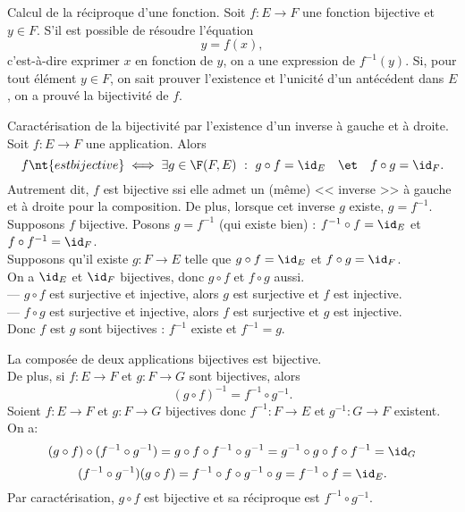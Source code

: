\documentclass[11pt]{article}
\begin{document}
\begin{meth}{Calcul de la réciproque d'une fonction.}{}
    Soit $f:E\to F$ une fonction bijective et $y\in F$. S'il est possible de résoudre l'équation
    \begin{equation*}
        y = f(x),
    \end{equation*}
    c'est-à-dire exprimer $x$ en fonction de $y$, on a une expression de $f^{-1}(y)$.\n
    Si, pour tout élément $y\in F$, on sait prouver l'existence et l'unicité d'un antécédent dans $E$, on a prouvé la bijectivité de $f$.
\end{meth}

\begin{thm}{Caractérisation de la bijectivité par l'existence d'un inverse à gauche et à droite.}{}
    Soit $f:E\to F$ une application. Alors
    \begin{equation*}
        f \nt{ est bijective} \iff \exists g \in \F(F,E) ~:~ g\circ f = \id_E \quad\et\quad f\circ g = \id_F.
    \end{equation*}
    Autrement dit, $f$ est bijective ssi elle admet un (même) << inverse >> à gauche et à droite pour la composition. De plus, lorsque cet inverse $g$ existe, $g=f^{-1}$.
    \tcblower
    \boxed{\ra} Supposons $f$ bijective. Posons $g=f^{-1}$ (qui existe bien) : $f^{-1}\circ f = \id_E$ et $f\circ f^{-1}=\id_F$.\\
    \boxed{\la} Supposons qu'il existe $g:F\to E$ telle que $g\circ f=\id_E$ et $f\circ g=\id_F$.\\
    On a $\id_E$ et $\id_F$ bijectives, donc $g\circ f$ et $f\circ g$ aussi.\\
    --- $g\circ f$ est surjective et injective, alors $g$ est surjective et $f$ est injective.\\
    --- $f\circ g$ est surjective et injective, alors $f$ est surjective et $g$ est injective.\\
    Donc $f$ est $g$ sont bijectives : $f^{-1}$ existe et $f^{-1}=g$.
\end{thm}

\begin{prop}{}{}
    La composée de deux applications bijectives est bijective.\\
    De plus, si $f:E\to F$ et $g:F\to G$ sont bijectives, alors
    \begin{equation*}
        (g\circ f)^{-1} = f^{-1} \circ g^{-1}.
    \end{equation*}
    \tcblower
    Soient $f:E\to F$ et $g:F\to G$ bijectives donc $f^{-1}:F\to E$ et $g^{-1}:G\to F$ existent. On a:
    \begin{equation*}
        (g\circ f)\circ(f^{-1}\circ g^{-1})=g\circ f \circ f^{-1} \circ g^{-1}=g^{-1}\circ g\circ f\circ f^{-1} = \id_G
    \end{equation*}
    \begin{equation*}
        (f^{-1}\circ g^{-1})(g\circ f) = f^{-1}\circ f \circ g^{-1}\circ g = f^{-1}\circ f = \id_E.
    \end{equation*}
    Par caractérisation, $g\circ f$ est bijective et sa réciproque est $f^{-1}\circ g^{-1}$.
\end{prop}
\end{document}
